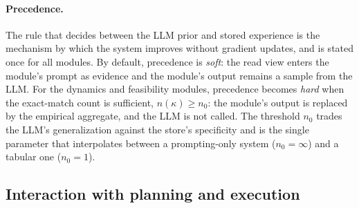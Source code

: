 \documentclass[11pt]{article}
\begin{document}
\paragraph{Precedence.}
The rule that decides between the LLM prior and stored experience is the mechanism by which the system improves without gradient updates, and is stated once for all modules. By default, precedence is \emph{soft}: the read view enters the module's prompt as evidence and the module's output remains a sample from the LLM. For the dynamics and feasibility modules, precedence becomes \emph{hard} when the exact-match count is sufficient, $n(\kappa)\ge n_0$: the module's output is replaced by the empirical aggregate, and the LLM is not called. The threshold $n_0$ trades the LLM's generalization against the store's specificity and is the single parameter that interpolates between a prompting-only system ($n_0=\infty$) and a tabular one ($n_0=1$).

\subsection{Interaction with planning and execution}
\label{sec:type2-interaction}
\end{document}

